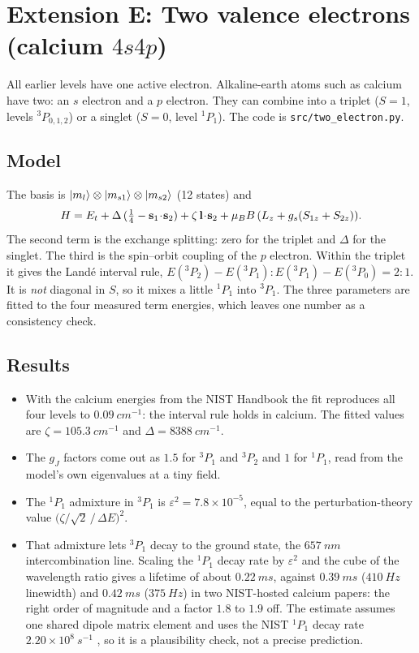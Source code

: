 \section{Extension E: Two valence electrons (calcium $4s4p$)}\label{sec:two-electron}
All earlier levels have one active electron. Alkaline-earth atoms such as calcium have two: an $s$ electron and a $p$ electron. They can combine into a triplet
($S=1$, levels $^3P_{0,1,2}$) or a singlet ($S=0$, level $^1P_1$). The code is \texttt{src/two\_electron.py}.

\subsection{Model}
The basis is $\ket{m_l}\otimes\ket{m_{s1}}\otimes\ket{m_{s2}}$ (12 states) and
\begin{equation}
  H = E_t + \Delta\,(\tfrac14 - \vb{s}_1\!\cdot\!\vb{s}_2) + \zeta\,\vb{l}\!\cdot\!\vb{s}_2 + \mu_B B\,(L_z + g_s(S_{1z}+S_{2z})).
\end{equation}
The second term is the exchange splitting: zero for the triplet and $\Delta$ for the singlet. The third is the spin--orbit coupling of the $p$ electron.
Within the triplet it gives the Land\'e interval rule, $E(^3P_2)-E(^3P_1) : E(^3P_1)-E(^3P_0) = 2:1$. It is \emph{not} diagonal in $S$,
so it mixes a little $^1P_1$ into $^3P_1$. The three parameters are fitted to the four measured term energies, which leaves one number as a consistency check.

\subsection{Results}
\begin{itemize}
  \item With the calcium energies from the NIST Handbook \cite{nistca} the fit reproduces all four levels to $0.09\ \si{cm^{-1}}$: the interval rule holds in calcium.
        The fitted values are $\zeta=105.3\ \si{cm^{-1}}$ and $\Delta=8388\ \si{cm^{-1}}$.
  \item The $g_J$ factors come out as $1.5$ for $^3P_1$ and $^3P_2$ and $1$ for $^1P_1$, read from the model's own eigenvalues at a tiny field.
  \item The $^1P_1$ admixture in $^3P_1$ is $\varepsilon^2 = 7.8\times10^{-5}$, equal to the perturbation-theory value $\bigl(\zeta/\sqrt2\,/\,\Delta E\bigr)^2$.
  \item That admixture lets $^3P_1$ decay to the ground state, the $657\ \si{nm}$ intercombination line. Scaling the $^1P_1$ decay rate by
        $\varepsilon^2$ and the cube of the wavelength ratio gives a lifetime of about $0.22\ \si{ms}$, against $0.39\ \si{ms}$ ($410\ \si{Hz}$ linewidth) and $0.42\ \si{ms}$ ($375\ \si{Hz}$) in two NIST-hosted calcium papers:
        the right order of magnitude and a factor $1.8$ to $1.9$ off. The estimate assumes one shared dipole matrix element and uses the NIST $^1P_1$ decay rate $2.20\times10^8\ \si{s^{-1}}$ \cite{nistca}, so it is a plausibility check, not a precise prediction.
\end{itemize}

